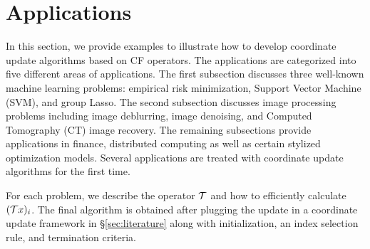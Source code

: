 \section{Applications}\label{sec:applications}
In this section, we provide examples to illustrate how to develop coordinate update algorithms based on CF operators. The applications are categorized into five different areas of applications. The first subsection discusses three well-known machine learning problems: empirical risk minimization, Support Vector Machine (SVM), and group Lasso. The second subsection  discusses image processing problems including image deblurring, image denoising, and  Computed Tomography (CT) image recovery. The remaining subsections provide applications in finance, distributed computing as well as certain stylized optimization models. Several applications are treated with coordinate update algorithms for the first time. 
\DIFaddbegin 

For each problem, we describe the operator ${\mathcal{T}}$ and how to efficiently calculate $({\mathcal{T}} x)_i$. The final algorithm is obtained after plugging the update in a coordinate update framework in \S\ref{sec:literature} along with  initialization, an index selection rule, and termination criteria.

